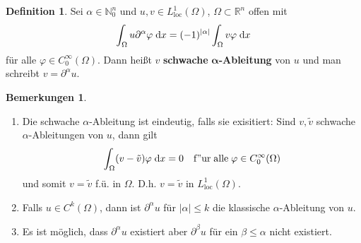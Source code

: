 \documentclass[
paper=a4,
bibtotocnumbered,
liststotocnumbered,
tablecaptionabove,
pointlessnumbers,
twoside,
openright,
10pt
]
{report}
\let\phi\varphi
\theoremstyle{definition}
\newtheorem*{df}{Definition}
\newtheorem*{rems}{Bemerkungen}
\numberwithin{equation}{chapter}
\begin{document}
\begin{df}
Sei $\alpha\in\mathbb{N}_0^n$ und $u,v\in L_{\mathrm{loc}}^1(\Omega)$, $\Omega\subset\mathbb{R}^n$ offen mit
\begin{equation}
\int_\Omega u\partial^\alpha\phi\d x= (-1)^{|\alpha|}\int_\Omega v\phi \d x
\end{equation}
für alle $\phi\in C_0^\infty(\Omega)$. Dann heißt $v$ \textbf{schwache} $\boldsymbol{\alpha}$\textbf{-Ableitung} von $u$ und man schreibt $v=\partial^\alpha u$.
\end{df}

\begin{rems}
\begin{enumerate}[\bf 1)]
\item Die schwache $\alpha$-Ableitung ist eindeutig, falls sie exisitiert: Sind $v,\tilde{v}$ schwache $\alpha$-Ableitungen von $u$, dann gilt
\begin{equation}
\int_\Omega (v-\tilde{v})\phi\d x =0\quad\mathrm{f"ur\; alle\;}\phi\in C_0^\infty(\Omega)
\end{equation}
und somit $v=\tilde{v}$ f.ü. in $\Omega$. D.h. $v=\tilde{v}$ in  $L_{\mathrm{loc}}^1(\Omega)$. 
\item Falls $u\in C^k(\Omega)$, dann ist $\partial^\alpha u$ für $|\alpha|\leq k$ die klassische $\alpha$-Ableitung von $u$.
\item Es ist möglich, dass $\partial^\alpha u$ existiert aber $\partial^\beta u$ für ein $\beta\leq \alpha$ nicht existiert.
\end{enumerate}
\end{rems}
\end{document}
